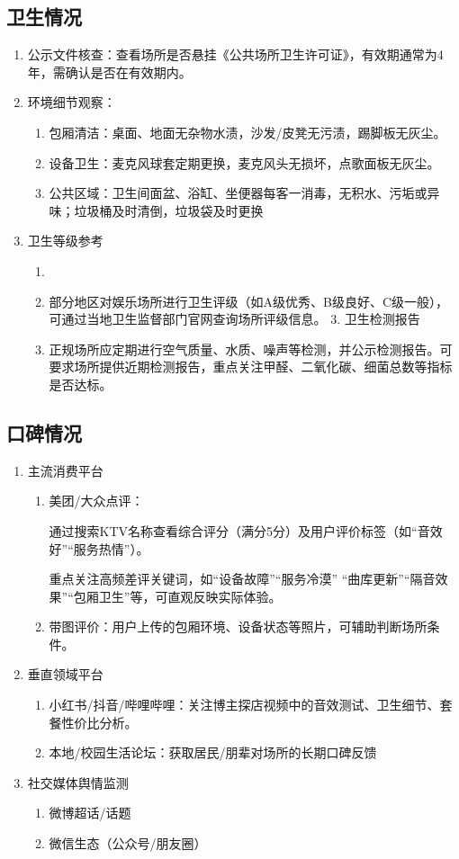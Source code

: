 \documentclass{amznotes}
\begin{document}
\subsection{卫生情况}
\begin{enumerate}
  \item 公示文件核查：查看场所是否悬挂《公共场所卫生许可证》，有效期通常为4年，需确认是否在有效期内。
  \item 环境细节观察：
         \begin{enumerate}
          \item 包厢清洁：桌面、地面无杂物水渍，沙发/皮凳无污渍，踢脚板无灰尘。
          \item 设备卫生：麦克风球套定期更换，麦克风头无损坏，点歌面板无灰尘。
          \item 公共区域：卫生间面盆、浴缸、坐便器每客一消毒，无积水、污垢或异味；垃圾桶及时清倒，垃圾袋及时更换
         \end{enumerate}
  \item 卫生等级参考
        \begin{enumerate}
          \item \item 部分地区对娱乐场所进行卫生评级（如A级优秀、B级良好、C级一般），可通过当地卫生监督部门官网查询场所评级信息。  3. 卫生检测报告
         \item 正规场所应定期进行空气质量、水质、噪声等检测，并公示检测报告。可要求场所提供近期检测报告，重点关注甲醛、二氧化碳、细菌总数等指标是否达标。
        \end{enumerate}
\end{enumerate}
\subsection{口碑情况}
\begin{enumerate}
  \item 主流消费平台
  \begin{enumerate}
    \item 美团/大众点评：

    通过搜索KTV名称查看综合评分（满分5分）及用户评价标签（如“音效好”“服务热情”）。

    重点关注高频差评关键词，如“设备故障”“服务冷漠” “曲库更新”“隔音效果”“包厢卫生”等，可直观反映实际体验。
    \item 带图评价：用户上传的包厢环境、设备状态等照片，可辅助判断场所条件。
  \end{enumerate}

  \item 垂直领域平台
        \begin{enumerate}
          \item 小红书/抖音/哔哩哔哩：关注博主探店视频中的音效测试、卫生细节、套餐性价比分析。
          \item 本地/校园生活论坛：获取居民/朋辈对场所的长期口碑反馈
        \end{enumerate}
  \item 社交媒体舆情监测
  \begin{enumerate}
    \item 微博超话/话题
    \item 微信生态（公众号/朋友圈）
  \end{enumerate}
\end{enumerate}
\end{document}
